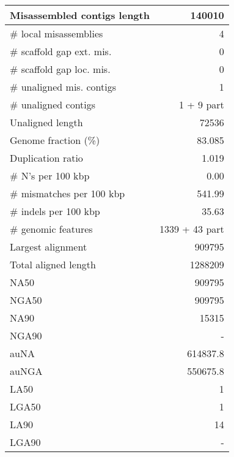 \documentclass[12pt,a4paper]{article}
\begin{document}
\begin{table}[ht]
\begin{center}
\begin{tabular}{|l*{1}{|r}|}
Misassembled contigs length & 140010 \\ \hline
\# local misassemblies & 4 \\ \hline
\# scaffold gap ext. mis. & 0 \\ \hline
\# scaffold gap loc. mis. & 0 \\ \hline
\# unaligned mis. contigs & 1 \\ \hline
\# unaligned contigs & 1 + 9 part \\ \hline
Unaligned length & 72536 \\ \hline
Genome fraction (\%) & 83.085 \\ \hline
Duplication ratio & 1.019 \\ \hline
\# N's per 100 kbp & 0.00 \\ \hline
\# mismatches per 100 kbp & 541.99 \\ \hline
\# indels per 100 kbp & 35.63 \\ \hline
\# genomic features & 1339 + 43 part \\ \hline
Largest alignment & 909795 \\ \hline
Total aligned length & 1288209 \\ \hline
NA50 & 909795 \\ \hline
NGA50 & 909795 \\ \hline
NA90 & 15315 \\ \hline
NGA90 & - \\ \hline
auNA & 614837.8 \\ \hline
auNGA & 550675.8 \\ \hline
LA50 & 1 \\ \hline
LGA50 & 1 \\ \hline
LA90 & 14 \\ \hline
LGA90 & - \\ \hline
\end{tabular}
\end{center}
\end{table}
\end{document}

